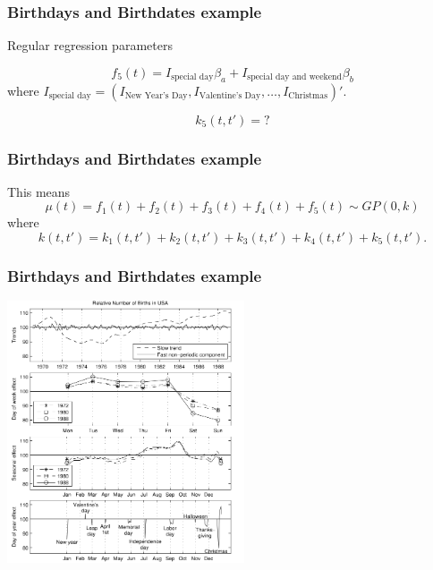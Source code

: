 \documentclass{beamer}
\begin{document}
\begin{frame}
\frametitle{Birthdays and Birthdates example}

Regular regression parameters

$$
f_5(t) = I_{\text{special day}}\beta_{a} + I_{\text{special day and weekend}}\beta_b
$$
where $I_{\text{special day}} = (I_{\text{New Year's Day} }, I_{\text{Valentine's Day} }, \ldots, I_{\text{Christmas} })'$.
\newline

$$
k_5(t,t') = ?
$$
\end{frame}



\begin{frame}
\frametitle{Birthdays and Birthdates example}

This means 
$$
\mu(t) = f_1(t) + f_2(t) + f_3(t) + f_4(t) + f_5(t) \sim GP(0, k)
$$
where
$$
k(t,t') = k_1(t,t') + k_2(t,t') + k_3(t,t') + k_4(t,t') + k_5(t,t').
$$

\end{frame}



\begin{frame}
\frametitle{Birthdays and Birthdates example}

\begin{center}
\includegraphics[width=70mm]{marginal_posterior.png}
\end{center}


\end{frame}
\end{document}
